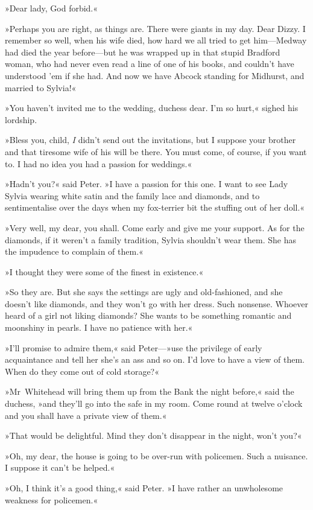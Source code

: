 »Dear lady, God forbid.«

»Perhaps you are right, as things are. There were giants in my day. Dear Dizzy. I remember so well, when his wife died, how hard we all tried to get him—Medway had died the year before—but he was wrapped up in that stupid Bradford woman, who had never even read a line of one of his books, and couldn't have understood 'em if she had. And now we have Abcock standing for Midhurst, and married to Sylvia!«

»You haven't invited me to the wedding, duchess dear. I'm so hurt,« sighed his lordship.

»Bless you, child, \textit{I} didn't send out the invitations, but I suppose your brother and that tiresome wife of his will be there. You must come, of course, if you want to. I had no idea you had a passion for weddings.«

»Hadn't you?« said Peter. »I have a passion for this one. I want to see Lady Sylvia wearing white satin and the family lace and diamonds, and to sentimentalise over the days when my fox-terrier bit the stuffing out of her doll.«

»Very well, my dear, you shall. Come early and give me your support. As for the diamonds, if it weren't a family tradition, Sylvia shouldn't wear them. She has the impudence to complain of them.«

»I thought they were some of the finest in existence.«

»So they are. But she says the settings are ugly and old-fashioned, and she doesn't like diamonds, and they won't go with her dress. Such nonsense. Whoever heard of a girl not liking diamonds? She wants to be something romantic and moonshiny in pearls. I have no patience with her.«

»I'll promise to admire them,« said Peter—»use the privilege of early acquaintance and tell her she's an ass and so on. I'd love to have a view of them. When do they come out of cold storage?«

»Mr~Whitehead will bring them up from the Bank the night before,« said the duchess, »and they'll go into the safe in my room. Come round at twelve o'clock and you shall have a private view of them.«

»That would be delightful. Mind they don't disappear in the night, won't you?«

»Oh, my dear, the house is going to be over-run with policemen. Such a nuisance. I suppose it can't be helped.«

»Oh, I think it's a good thing,« said Peter. »I have rather an unwholesome weakness for policemen.«

